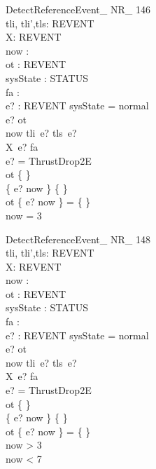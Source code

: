 \begin{schema}{DetectReferenceEvent\_ NR\_ 146}\\
tli, tli',tls: REVENT \fun \nat \\
X: REVENT \fun \nat \\
 now : \nat \\
 ot : REVENT \pfun \nat \\
 sysState : STATUS \\
 fa : \nat \\
 e? : REVENT 
\where
 sysState = normal \\
 e? \notin \dom ot \\
 now \in tli~e? \upto tls~e? \\
 X~e? \geq fa \\
 e? = ThrustDrop2E \\
 ot \neq \{ \} \\
 \{ e? \mapsto now \} \neq \{ \} \\
 ot \cap \{ e? \mapsto now \} = \{ \} \\
 now = 3
\end{schema}

\begin{schema}{DetectReferenceEvent\_ NR\_ 148}\\
tli, tli',tls: REVENT \fun \nat \\
X: REVENT \fun \nat \\
 now : \nat \\
 ot : REVENT \pfun \nat \\
 sysState : STATUS \\
 fa : \nat \\
 e? : REVENT 
\where
 sysState = normal \\
 e? \notin \dom ot \\
 now \in tli~e? \upto tls~e? \\
 X~e? \geq fa \\
 e? = ThrustDrop2E \\
 ot \neq \{ \} \\
 \{ e? \mapsto now \} \neq \{ \} \\
 ot \cap \{ e? \mapsto now \} = \{ \} \\
 now > 3 \\
 now < 7
\end{schema}

